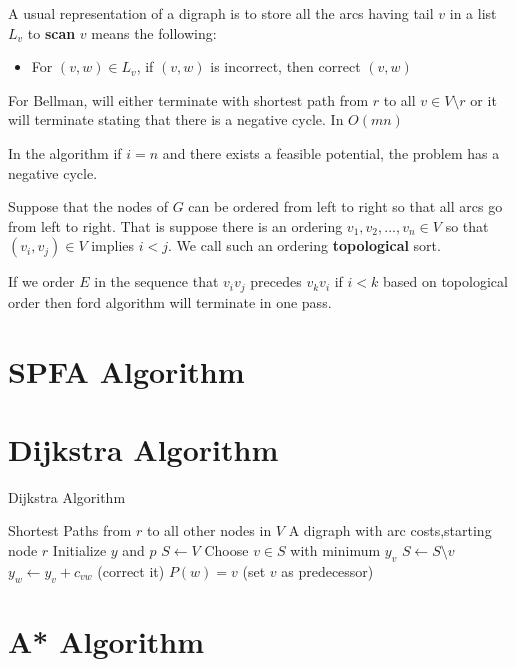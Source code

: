 			A usual representation of a digraph is to store all the arcs having tail $v$ in a list $L_v$ to \textbf{scan} $v$ means the following:
			\begin{itemize}
				\item For $(v, w) \in L_v$, if $(v, w)$ is incorrect, then correct $(v, w)$
			\end{itemize}

			For Bellman, will either terminate with shortest path from $r$ to all $v\in V\setminus r$ or it will terminate stating that there is a negative cycle. In $O(mn)$

			In the algorithm if $i = n$ and there exists a feasible potential, the problem has a negative cycle.

			Suppose that the nodes of $G$ can be ordered from left to right so that all arcs go from left to right. That is suppose there is an ordering $v_1, v_2, ..., v_n \in V$ so that $(v_i, v_j) \in V$ implies $i < j$. We call such an ordering \textbf{topological} sort.

			If we order $E$ in the sequence that $v_iv_j$ precedes $v_kv_i$ if $i<k$ based on topological order then ford algorithm will terminate in one pass.

		\section{SPFA Algorithm}

		\section{Dijkstra Algorithm}
			\begin{algorithm}
				\caption{Dijkstra Algorithm}
				\begin{algorithmic}
					\ENSURE Shortest Paths from $r$ to all other nodes in $V$
					\REQUIRE A digraph with arc costs,starting node $r$
					\STATE Initialize $y$ and $p$
					\STATE $S \gets V$
						\STATE Choose $v \in S$ with minimum $y_v$
						\STATE $S \gets S\setminus v$
								\STATE $y_w \gets y_v + c_{vw}$ (correct it)
								\STATE $P(w) = v$ (set $v$ as predecessor)
							\ENDIF
						\ENDFOR
					\ENDWHILE
				\end{algorithmic}
			\end{algorithm}

		\section{A* Algorithm}

